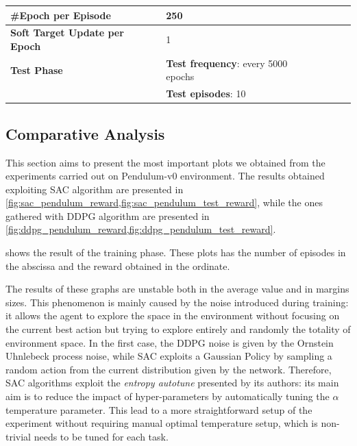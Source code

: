 \begin{table}[!h]
{\begin{tabular}{@{}lllll@{}}
			\textbf{\#Epoch per Episode}          & 250                                                    \\\midrule
			\textbf{Soft Target Update per Epoch} & 1                                                      \\\midrule
			\textbf{Test Phase}                   & \textbf{Test frequency}: every 5000 epochs             \\
			                                      & \textbf{Test episodes}: 10                             \\
			\bottomrule
		\end{tabular}}
\end{table}

\FloatBarrier

\subsection{Comparative Analysis}

This section aims to present the most important plots we obtained from the experiments carried out on Pendulum-v0 environment.
The results obtained exploiting SAC algorithm are presented in \vref{fig:sac_pendulum_reward,fig:sac_pendulum_test_reward}, while the ones gathered with DDPG algorithm are presented in \vref{fig:ddpg_pendulum_reward,fig:ddpg_pendulum_test_reward}.

 shows the result of the training phase.
These plots has the number of episodes in the abscissa and the reward obtained in the ordinate.


The results of these graphs are unstable both in the average value and in margins sizes.
This phenomenon is mainly caused by the noise introduced during training: it allows the agent to explore the space in the environment without focusing on the current best action but trying to explore entirely and randomly the totality of environment space.
In the first case, the DDPG noise is given by the Ornstein Uhnlebeck process noise, while SAC exploits a Gaussian Policy by sampling a random action from the current distribution given by the network.
Therefore, SAC algorithms exploit the \textit{entropy autotune} presented by its authors: its main aim is to reduce the impact of hyper-parameters by automatically tuning the $\alpha$ temperature parameter.
This lead to a more straightforward setup of the experiment without requiring manual optimal temperature setup, which is non-trivial needs to be tuned for each task.

